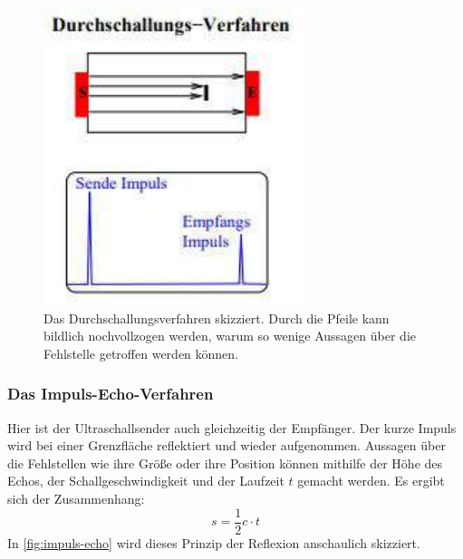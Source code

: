 \begin{figure}
    \centering
    \includegraphics[width=\textwidth]{content/durchschall.pdf}
    \caption{Das Durchschallungsverfahren skizziert. Durch die Pfeile kann bildlich nochvollzogen werden, warum so wenige Aussagen über die Fehlstelle getroffen werden können.\cite{anleitung}}
    \label{fig:durchschall}
\end{figure}

\subsubsection{Das Impuls-Echo-Verfahren}
\label{subsubsec:impuls-echo}
Hier ist der Ultraschallsender auch gleichzeitig der Empfänger.
Der kurze Impuls wird bei einer Grenzfläche reflektiert und wieder aufgenommen.
Aussagen über die Fehlstellen wie ihre Größe oder ihre Position können mithilfe der Höhe des Echos, der Schallgeschwindigkeit und der Laufzeit $t$ gemacht werden.
Es ergibt sich der Zusammenhang: 
\begin{equation} \label{eqn:schallgeschw}
    s = \frac{1}{2} c \cdot t
\end{equation}
In \autoref{fig:impuls-echo} wird dieses Prinzip der Reflexion anschaulich skizziert.

